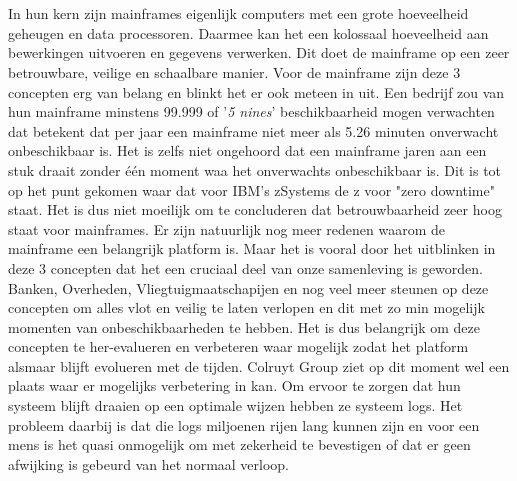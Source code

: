 
\chapter{}%
\label{ch:inleiding}

In hun kern zijn mainframes eigenlijk computers met een grote hoeveelheid geheugen en data processoren. Daarmee kan het een kolossaal hoeveelheid aan bewerkingen uitvoeren en gegevens verwerken. Dit doet de mainframe op een zeer betrouwbare, veilige en schaalbare manier. Voor de mainframe zijn deze 3 concepten erg van belang en blinkt het er ook meteen in uit. Een bedrijf zou van hun mainframe minstens 99.999 of '\textit{5 nines}' beschikbaarheid mogen verwachten dat betekent dat per jaar een mainframe niet meer als 5.26 minuten onverwacht onbeschikbaar is. Het is zelfs niet ongehoord dat een mainframe jaren aan een stuk draait zonder één moment waa het onverwachts onbeschikbaar is. Dit is tot op het punt gekomen waar dat voor IBM's zSystems de z voor "zero downtime" staat. Het is dus niet moeilijk om te concluderen dat betrouwbaarheid zeer hoog staat voor mainframes. Er zijn natuurlijk nog meer redenen waarom de mainframe een belangrijk platform is. Maar het is vooral door het uitblinken in deze 3 concepten dat het een cruciaal deel van onze samenleving is geworden. Banken, Overheden, Vliegtuigmaatschapijen en nog veel meer steunen op deze concepten om alles vlot en veilig te laten verlopen en dit met zo min mogelijk momenten van onbeschikbaarheden te hebben. Het is dus belangrijk om deze concepten te her-evalueren en verbeteren waar mogelijk zodat het platform alsmaar blijft evolueren met de tijden. Colruyt Group ziet op dit moment wel een plaats waar er mogelijks verbetering in kan. Om ervoor te zorgen dat hun systeem blijft draaien op een optimale wijzen hebben ze systeem logs. Het probleem daarbij is dat die logs miljoenen rijen lang kunnen zijn en voor een mens is het quasi onmogelijk om met zekerheid te bevestigen of dat er geen afwijking is gebeurd van het normaal verloop.  



\section{}%
\label{sec:probleemstelling}


